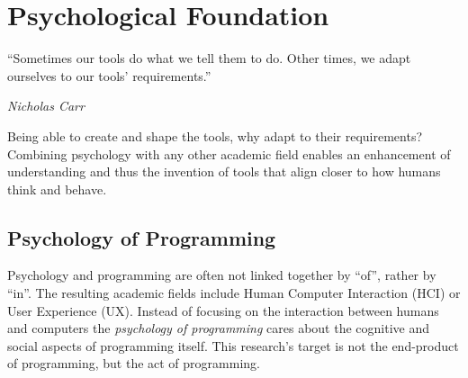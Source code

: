 \chapter{Psychological Foundation}
\label{chap:psychological-foundation}
\epigraph{``Sometimes our tools do what we tell them to do. Other times, we adapt ourselves to our tools’ requirements.''}{\textit{Nicholas Carr}}
\noindent
Being able to create and shape the tools, why adapt to their requirements?
Combining psychology with any other academic field enables an enhancement of understanding and thus the invention of tools that align closer to how humans think and behave.

\section{Psychology of Programming}
\label{sec:psychology-of-programming}
Psychology and programming are often not linked together by ``of'', rather by ``in''.
The resulting academic fields include Human Computer Interaction (HCI) or User Experience (UX).
Instead of focusing on the interaction between humans and computers the \emph{psychology of programming} cares about the cognitive and social aspects of programming itself.
This research's target is not the end-product of programming, but the act of programming.

